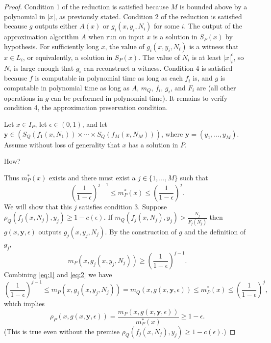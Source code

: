 \documentclass{article}
\begin{document}
\begin{proof}
  Condition 1 of the reduction is satisfied because $M$ is bounded above by a polynomial in $|x|$, as previously stated.
  Condition 2 of the reduction is satisfied because $g$ outputs either $A(x)$ or $g_i(x, y_i, N_i)$ for some $i$.
  The output of the approximation algorithm $A$ when run on input $x$ is a solution in $S_P(x)$ by hypothesis.
  For sufficiently long $x$, the value of $g_i(x, y_i, N_i)$ is a witness that $x \in L_i$, or equivalently, a solution in $S_P(x)$.
  The value of $N_i$ is at least $|x|^c_i$, so $N_i$ is large enough that $g_i$ can reconstruct a witness.
  Condition 4 is satisfied because $f$ is computable in polynomial time as long as each $f_i$ is, and $g$ is computable in polynomial time as long as $A$, $m_Q$, $f_i$, $g_i$, and $F_i$ are (all other operations in $g$ can be performed in polynomial time).
  It remains to verify condition 4, the approximation preservation condition.

  Let $x \in I_P$, let $\epsilon \in (0, 1)$, and let $\mathbf{y} \in (S_Q(f_1(x, N_1)) \times \dotsb \times S_Q(f_M(x, N_M)))$, where $\mathbf{y} = (y_1, \dotsc, y_M)$.
  Assume without loss of generality that $x$ has a solution in $P$.
  \begin{todo}
    How?
  \end{todo}
  Thus $m_P^*(x)$ exists and there must exist a $j \in \{1, \dotsc, M\}$ such that
  \begin{equation}\label{eq:1}
    \left(\frac{1}{1 - \epsilon}\right)^{j - 1} \leq m_P^*(x) \leq \left(\frac{1}{1 - \epsilon}\right)^j.
  \end{equation}
  We will show that this $j$ satisfies condition 3.
  Suppose $\rho_Q(f_j(x, N_j), y_j) \geq 1 - c(\epsilon)$.
  If $m_Q(f_j(x, N_j), y_j) > \frac{N_j}{F_j(N_j)}$ then $g(x, \mathbf{y}, \epsilon)$ outputs $g_j(x, y_j, N_j)$.
  By the construction of $g$ and the definition of $g_j$,
  \begin{equation}\label{eq:2}
    m_P(x, g_j(x, y_j, N_j)) \geq \left(\frac{1}{1 - \epsilon}\right)^{j - 1}.
  \end{equation}
  Combining \autoref{eq:1} and \autoref{eq:2} we have
  \begin{equation*}
    \left(\frac{1}{1 - \epsilon}\right)^{j - 1} \leq m_P(x, g_j(x, y_j, N_j)) = m_Q(x, g(x, \mathbf{y}, \epsilon)) \leq m_P^*(x) \leq \left(\frac{1}{1 - \epsilon}\right)^j,
  \end{equation*}
  which implies
  \begin{equation*}
    \rho_P(x, g(x, \mathbf{y}, \epsilon)) = \frac{m_P(x, g(x, \mathbf{y}, \epsilon))}{m_P^*(x)} \geq 1 - \epsilon.
  \end{equation*}
  (This is true even without the premise $\rho_Q(f_j(x, N_j), y_j) \geq 1 - c(\epsilon)$.)


\end{proof}
\end{document}
